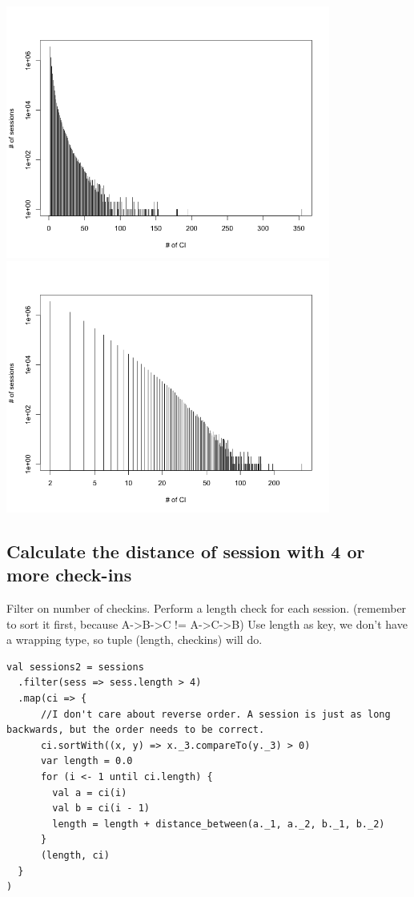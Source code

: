 \documentclass[abstract=on]{article}
\begin{document}
\begin{center}
\includegraphics[width=0.8\textwidth]{log-hist.png}\\
\includegraphics[width=0.8\textwidth]{log_log_hist.png}
\end{center}


\subsection{Calculate the distance of session with 4 or more check-ins}
Filter on number of checkins.
Perform a length check for each session. (remember to sort it first, because A->B->C != A->C->B)
Use length as key, we don't have a wrapping type, so tuple (length, checkins) will do.
\begin{lstlisting}
val sessions2 = sessions
  .filter(sess => sess.length > 4)
  .map(ci => {
      //I don't care about reverse order. A session is just as long backwards, but the order needs to be correct.
      ci.sortWith((x, y) => x._3.compareTo(y._3) > 0)
      var length = 0.0
      for (i <- 1 until ci.length) {
        val a = ci(i)
        val b = ci(i - 1)
        length = length + distance_between(a._1, a._2, b._1, b._2)
      }
      (length, ci)
  }
)
\end{lstlisting}
\end{document}
